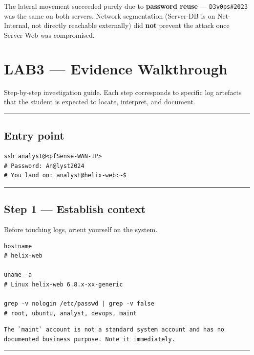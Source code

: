 The lateral movement succeeded purely due to \textbf{password reuse} --- \texttt{D3v0ps\#2023} was the same on both servers. Network segmentation (Server-DB is on Net-Internal, not directly reachable externally) did \textbf{not} prevent the attack once Server-Web was compromised.

\section{LAB3 --- Evidence Walkthrough}

Step-by-step investigation guide. Each step corresponds to specific log artefacts that the student is expected to locate, interpret, and document.

\begin{center}\rule{0.5\linewidth}{0.5pt}\end{center}

\subsection{Entry point}

\begin{lstlisting}
ssh analyst@<pfSense-WAN-IP>
# Password: An@lyst2024
# You land on: analyst@helix-web:~$
\end{lstlisting}

\begin{center}\rule{0.5\linewidth}{0.5pt}\end{center}

\subsection{Step 1 --- Establish context}

Before touching logs, orient yourself on the system.

\begin{lstlisting}
hostname
# helix-web

uname -a
# Linux helix-web 6.8.x-xx-generic

grep -v nologin /etc/passwd | grep -v false
# root, ubuntu, analyst, devops, maint
\end{lstlisting}

\begin{lstlisting}
The `maint` account is not a standard system account and has no documented business purpose. Note it immediately.
\end{lstlisting}

\begin{center}\rule{0.5\linewidth}{0.5pt}\end{center}

